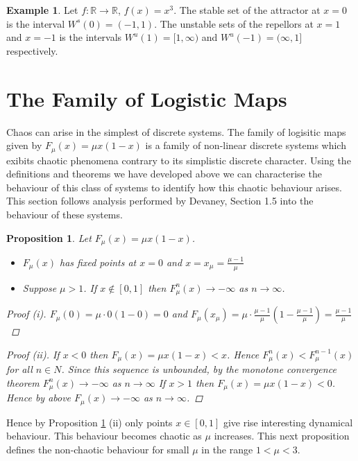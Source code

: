 \documentclass[11pt,a4paper,oneside]{memoir}
\theoremstyle{plain}
\newtheorem{prop}[thm]{Proposition}
\theoremstyle{definition}
\newtheorem{exmp}[thm]{Example}
\begin{document}
\begin{exmp}
    Let $f: \mathbb{R} \to \mathbb{R}$, $f(x) = x^3$. The stable set of the attractor at $x = 0$ is the interval $W^s(0) = (-1, 1)$. The unstable sets of the repellors at $x = 1$ and $x = -1$ is the intervals $W^u(1) = [1, \infty)$ and $W^u(-1) = (\infty, 1]$ respectively.
\end{exmp}

\section{The Family of Logistic Maps} \label{sec:logistic_maps}
Chaos can arise in the simplest of discrete systems. The family of logisitic maps given by $F_\mu(x) = \mu x(1-x)$ is a family of non-linear discrete systems which exibits chaotic phenomena contrary to its simplistic discrete character. Using the definitions and theorems we have developed above we can characterise the behaviour of this class of systems to identify how this chaotic behaviour arises. This section follows analysis performed by Devaney, Section 1.5 \cite{devaney} into the behaviour of these systems.

\begin{prop} Let $F_\mu(x) = \mu x(1-x)$. \label{prop:logistic1}
    \begin{itemize}
        \item[(i)] $F_\mu(x)$ has fixed points at $x = 0$ and $x = x_{\mu} = \frac{\mu - 1}{\mu}$
        \item[(ii)] Suppose $\mu > 1$. If $x \notin [0, 1]$ then $F_\mu^n(x) \to - \infty$ as $n \to \infty$.
    \end{itemize}
    \begin{proof}[Proof (i)]
        $F_{\mu}(0) = \mu \cdot 0(1 - 0) = 0$ and $F_{\mu}(x_\mu) = \mu \cdot \frac{\mu - 1}{\mu} \left(1 - \frac{\mu - 1}{\mu}\right) = \frac{\mu - 1}{\mu}$ 
    \end{proof}
    \begin{proof}[Proof (ii)]
        If $x < 0$ then $F_\mu(x) = \mu x(1-x) < x$. Hence $F_\mu^n(x) < F_\mu^{n-1}(x)$ for all $n \in N$. Since this sequence is unbounded, by the monotone convergence theorem $F_\mu^n(x) \to - \infty$ as $n \to \infty$ If $x > 1$ then $F_\mu(x) = \mu x (1-x) < 0$. Hence by above $F_\mu(x) \to - \infty$ as $n \to \infty$.
    \end{proof}
\end{prop}
Hence by Proposition \ref{prop:logistic1} (ii) only points $x \in [0, 1]$ give rise interesting dynamical behaviour. This behaviour becomes chaotic as $\mu $ increases. This next proposition defines the non-chaotic behaviour for small $\mu$ in the range $1 < \mu < 3$.
\end{document}
